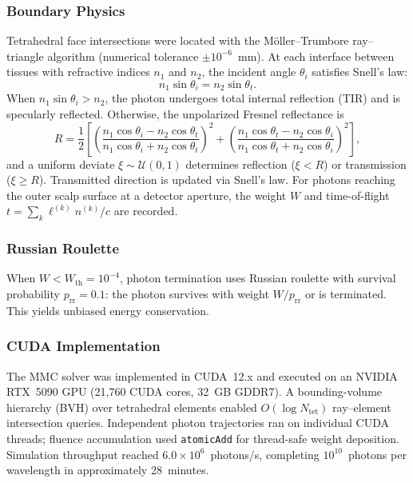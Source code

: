 \documentclass[11pt,a4paper]{article}
\begin{document}
\subsubsection*{Boundary Physics}

Tetrahedral face intersections were located with the M\"{o}ller--Trumbore ray--triangle algorithm\cite{moller1997fast} (numerical tolerance $\pm10^{-6}$~mm). At each interface between tissues with refractive indices $n_1$ and $n_2$, the incident angle $\theta_i$ satisfies Snell's law:
\begin{equation}
    n_1 \sin\theta_i = n_2 \sin\theta_t.
\end{equation}
When $n_1\sin\theta_i > n_2$, the photon undergoes total internal reflection (TIR) and is specularly reflected. Otherwise, the unpolarized Fresnel reflectance is
\begin{equation}
    R = \frac{1}{2}\!\left[
    \left(\frac{n_1\cos\theta_i - n_2\cos\theta_t}{n_1\cos\theta_i + n_2\cos\theta_t}\right)^{\!2}
    +
    \left(\frac{n_1\cos\theta_t - n_2\cos\theta_i}{n_1\cos\theta_t + n_2\cos\theta_i}\right)^{\!2}
    \right],
    \label{eq:fresnel}
\end{equation}
and a uniform deviate $\xi \sim \mathcal{U}(0,1)$ determines reflection ($\xi < R$) or transmission ($\xi \geq R$). Transmitted direction is updated via Snell's law. For photons reaching the outer scalp surface at a detector aperture, the weight $W$ and time-of-flight $t = \sum_k \ell^{(k)} n^{(k)} / c$ are recorded.

\subsubsection*{Russian Roulette}

When $W < W_\mathrm{th} = 10^{-4}$, photon termination uses Russian roulette with survival probability $p_\mathrm{rr} = 0.1$: the photon survives with weight $W/p_\mathrm{rr}$ or is terminated. This yields unbiased energy conservation.

\subsubsection*{CUDA Implementation}

The MMC solver was implemented in CUDA~12.x and executed on an NVIDIA RTX~5090 GPU (21{,}760 CUDA cores, 32~GB GDDR7). A bounding-volume hierarchy (BVH) over tetrahedral elements enabled $O(\log N_\mathrm{tet})$ ray--element intersection queries. Independent photon trajectories ran on individual CUDA threads; fluence accumulation used \texttt{atomicAdd} for thread-safe weight deposition. Simulation throughput reached $6.0 \times 10^6$~photons/s, completing $10^{10}$~photons per wavelength in approximately 28~minutes.
\end{document}
